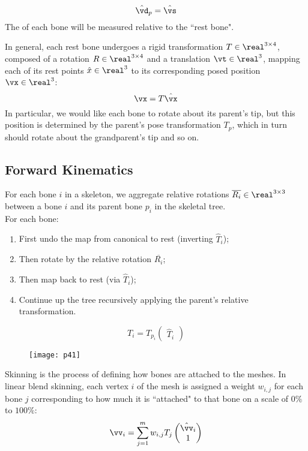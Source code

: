 \documentclass[11pt]{article}
\numberwithin{equation}{section}
\begin{document}
\begin{equation}
	\hat{\vd}_p = \hat{\vs}
\end{equation}
\remark
The  of each bone will be measured relative to the ``rest bone".

In general, each rest bone undergoes a rigid transformation $T \in \real^{3\times 4}$, composed of a rotation $R \in \real^{3 \times 4}$ and a translation $\vt \in \real^3$, mapping each of its rest points $\hat{x} \in \real^3$ to its corresponding posed position $\vx \in \real^3$:
\begin{equation}
	\vx = T\hat{\vx}
\end{equation}
\remark
In particular, we would like each bone to rotate about its parent's tip, but this position is determined by the parent's pose transformation $T_p$, which in turn should rotate about the grandparent's tip and so on.

\subsection{Forward Kinematics}
For each bone $i$ in a skeleton, we aggregate relative rotations $\overline{R_i} \in \real^{3\times 3}$ between a bone $i$ and its parent bone $p_i$ in the skeletal tree.\\
For each bone:
\begin{enumerate}
	\item First undo the map from canonical to rest (inverting $\hat{T}_i$);
	\item Then rotate by the relative rotation $\overline{R_i}$;
	\item Then map back to rest (via $\hat{T}_i$);
	\item Continue up the tree recursively applying the parent's relative transformation.
\end{enumerate}
\begin{equation}
	T_i = T_{p_i}\begin{pmatrix}
		\hat{T}_i 
	\end{pmatrix}
\end{equation}
\begin{figure}[H]
	\centering
	\texttt{[image: p41]}
\end{figure}

Skinning is the process of defining how bones are attached to the meshes. In linear blend skinning, each vertex $i$ of the mesh is assigned a weight $w_{i,j}$ for each bone $j$ corresponding to how much it is ``attached" to that bone on a scale of $0\%$ to $100\%$:
\begin{equation}
	\vv_i = \sum_{j=1}^m w_{i,j}T_j\begin{pmatrix}
		\hat{\vv}_i \\ 1
	\end{pmatrix}
\end{equation}
\end{document}
